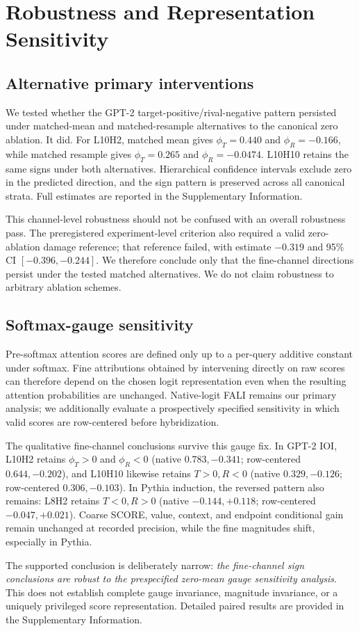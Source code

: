 \section{Robustness and Representation Sensitivity}\label{sec:robustness}

\subsection{Alternative primary interventions}\label{sec:gpt2-robustness}

We tested whether the GPT-2 target-positive/rival-negative pattern persisted under matched-mean and matched-resample alternatives to the canonical zero ablation. It did. For L10H2, matched mean gives $\phi_T=0.440$ and $\phi_R=-0.166$, while matched resample gives $\phi_T=0.265$ and $\phi_R=-0.0474$. L10H10 retains the same signs under both alternatives. Hierarchical confidence intervals exclude zero in the predicted direction, and the sign pattern is preserved across all canonical strata. Full estimates are reported in the Supplementary Information.

This channel-level robustness should not be confused with an overall robustness pass. The preregistered experiment-level criterion also required a valid zero-ablation damage reference; that reference failed, with estimate $-0.319$ and 95\% CI $[-0.396,-0.244]$. We therefore conclude only that the fine-channel directions persist under the tested matched alternatives. We do not claim robustness to arbitrary ablation schemes.

\subsection{Softmax-gauge sensitivity}\label{sec:gauge}

Pre-softmax attention scores are defined only up to a per-query additive constant under softmax. Fine attributions obtained by intervening directly on raw scores can therefore depend on the chosen logit representation even when the resulting attention probabilities are unchanged. Native-logit FALI remains our primary analysis; we additionally evaluate a prospectively specified sensitivity in which valid scores are row-centered before hybridization.

The qualitative fine-channel conclusions survive this gauge fix. In GPT-2 IOI, L10H2 retains $\phi_T>0$ and $\phi_R<0$ (native $0.783,-0.341$; row-centered $0.644,-0.202$), and L10H10 likewise retains $T>0,R<0$ (native $0.329,-0.126$; row-centered $0.306,-0.103$). In Pythia induction, the reversed pattern also remains: L8H2 retains $T<0,R>0$ (native $-0.144,+0.118$; row-centered $-0.047,+0.021$). Coarse SCORE, value, context, and endpoint conditional gain remain unchanged at recorded precision, while the fine magnitudes shift, especially in Pythia.

The supported conclusion is deliberately narrow: \emph{the fine-channel sign conclusions are robust to the prespecified zero-mean gauge sensitivity analysis}. This does not establish complete gauge invariance, magnitude invariance, or a uniquely privileged score representation. Detailed paired results are provided in the Supplementary Information.
